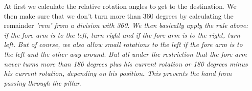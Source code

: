 At first we calculate the relative rotation angles to get to the destination. We then make sure that we don't turn more than 360 degrees by calculating the remainder \em{'rem'} from a division with 360. We then basically apply the rule above: if the fore arm is to the left, turn right and if the fore arm is to the right, turn left. But of course, we also allow small rotations to the left if the fore arm is to the left and the other way around. But all under the restriction that the fore arm never turns more than 180 degrees plus his current rotation or 180 degrees minus his current rotation, depending on his position. This prevents the hand from passing through the pillar.


